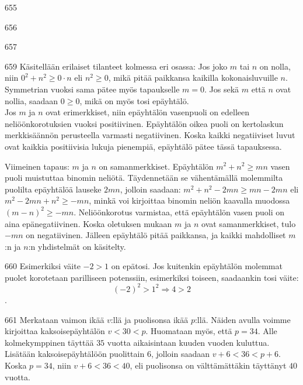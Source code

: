 \begin{Vastaus}{655}
	
\end{Vastaus}
\begin{Vastaus}{656}
	
\end{Vastaus}
\begin{Vastaus}{657}
	
\end{Vastaus}
\begin{Vastaus}{659}
		Käsitellään erilaiset tilanteet kolmessa eri osassa:
		Jos joko $m$ tai $n$ on nolla, niin $0^2+n^2 \geq 0\cdot n$ eli $n^2\geq 0$, mikä pitää paikkansa kaikilla kokonaisluvuille $n$. Symmetrian vuoksi sama pätee myös tapaukselle $m=0$. Jos sekä $m$ että $n$ ovat nollia, saadaan $0\geq 0$, mikä on myös tosi epäyhtälö. \\
		Jos $m$ ja $n$ ovat erimerkkiset, niin epäyhtälön vasenpuoli on edelleen neliöönkorotuksien vuoksi positiivinen. Epäyhtälön oikea puoli on kertolaskun merkkisäännön perusteella varmasti negatiivinen. Koska kaikki negatiiviset luvut ovat kaikkia positiivisia lukuja pienempiä, epäyhtälö pätee tässä tapauksessa.

		Viimeinen tapaus: $m$ ja $n$ on samanmerkkiset. Epäyhtälön $m^2+n^2 \geq mn$ vasen puoli muistuttaa binomin neliötä. Täydennetään se vähentämällä molemmilta puolilta epäyhtälöä lauseke $2mn$, jolloin saadaan: $m^2+n^2-2mn \geq mn-2mn$ eli $m^2-2mn+n^2 \geq -mn$, minkä voi kirjoittaa binomin neliön kaavalla muodossa $(m-n)^2 \geq -mn$. Neliöönkorotus varmistaa, että epäyhtälön vasen puoli on aina epänegatiivinen. Koska oletuksen mukaan $m$ ja $n$ ovat samanmerkkiset, tulo $-mn$ on negatiivinen. Jälleen epäyhtälö pitää paikkansa, ja kaikki mahdolliset $m$:n ja $n$:n yhdistelmät on käsitelty.
		
\end{Vastaus}
\begin{Vastaus}{660}
	Esimerkiksi väite $-2>1$ on epätosi. Jos kuitenkin epäyhtälön molemmat puolet korotetaan parilliseen potenssiin, esimerkiksi toiseen, saadaankin tosi väite: \[(-2)^2>1^2 \Rightarrow 4>2\].
	
\end{Vastaus}
\begin{Vastaus}{661}
		Merkataan vaimon ikää $v$:llä ja puolisonsa ikää $p$:llä. Näiden avulla voimme kirjoittaa kaksoisepäyhtälön $v<30<p$. Huomataan myös, että $p=34$. Alle kolmekymppinen täyttää $35$ vuotta aikaisintaan kuuden vuoden kuluttua. Lisätään kaksoisepäyhtälöön puolittain $6$, jolloin saadaan $v+6<36<p+6$. Koska $p=34$, niin $v+6<36<40$, eli puolisonsa on välttämättäkin täyttänyt $40$ vuotta.
		
\end{Vastaus}
